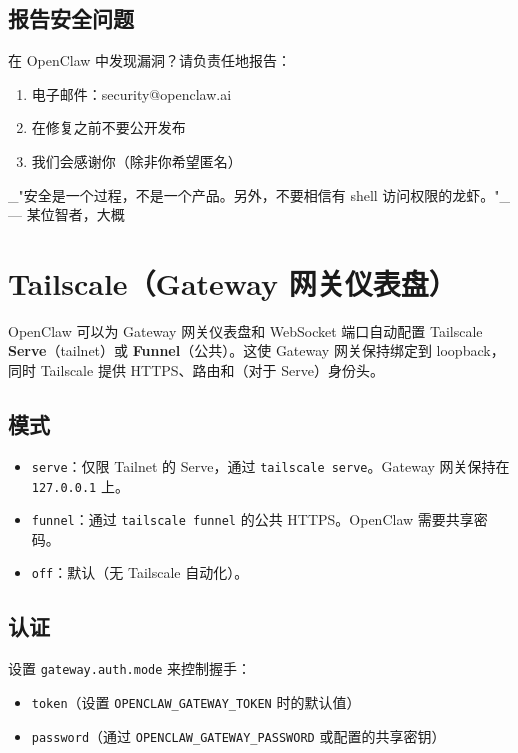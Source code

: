 \subsection{报告安全问题}


在 OpenClaw 中发现漏洞？请负责任地报告：

\begin{enumerate}
  \item 电子邮件：security@openclaw.ai
  \item 在修复之前不要公开发布
  \item 我们会感谢你（除非你希望匿名）
\end{enumerate}


\hrulefill


\_"安全是一个过程，不是一个产品。另外，不要相信有 shell 访问权限的龙虾。"\_ — 某位智者，大概



\clearpage

\section{Tailscale（Gateway 网关仪表盘）}


OpenClaw 可以为 Gateway 网关仪表盘和 WebSocket 端口自动配置 Tailscale \textbf{Serve}（tailnet）或 \textbf{Funnel}（公共）。这使 Gateway 网关保持绑定到 loopback，同时 Tailscale 提供 HTTPS、路由和（对于 Serve）身份头。

\subsection{模式}


\begin{itemize}
  \item \texttt{serve}：仅限 Tailnet 的 Serve，通过 \texttt{tailscale serve}。Gateway 网关保持在 \texttt{127.0.0.1} 上。
  \item \texttt{funnel}：通过 \texttt{tailscale funnel} 的公共 HTTPS。OpenClaw 需要共享密码。
  \item \texttt{off}：默认（无 Tailscale 自动化）。
\end{itemize}


\subsection{认证}


设置 \texttt{gateway.auth.mode} 来控制握手：

\begin{itemize}
  \item \texttt{token}（设置 \texttt{OPENCLAW\_GATEWAY\_TOKEN} 时的默认值）
  \item \texttt{password}（通过 \texttt{OPENCLAW\_GATEWAY\_PASSWORD} 或配置的共享密钥）
\end{itemize}


